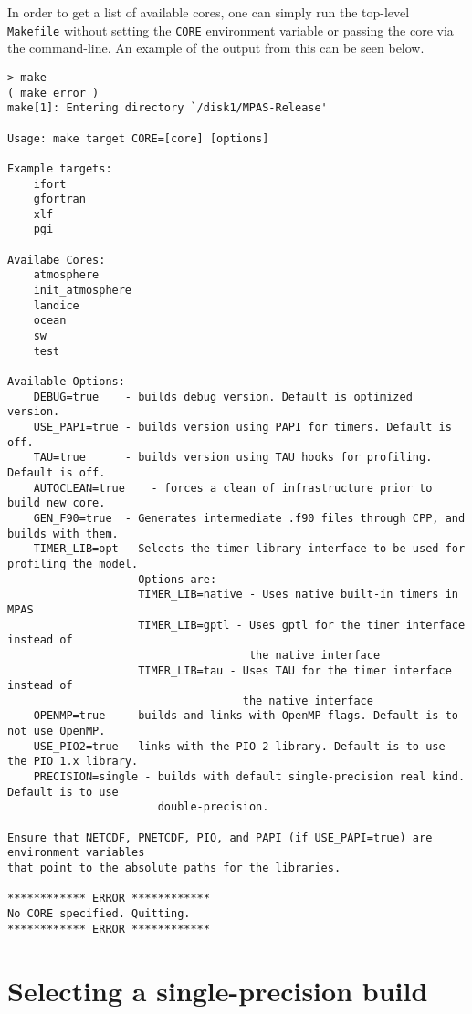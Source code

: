 In order to get a list of available cores, one can simply run the top-level {\tt
Makefile} without setting the {\tt CORE} environment variable or passing the
core via the command-line. An example of the output from this can be seen
below.

{\small
\begin{verbatim}
> make
( make error )
make[1]: Entering directory `/disk1/MPAS-Release'

Usage: make target CORE=[core] [options]

Example targets:
    ifort
    gfortran
    xlf
    pgi

Availabe Cores:
    atmosphere
    init_atmosphere
    landice
    ocean
    sw
    test

Available Options:
    DEBUG=true    - builds debug version. Default is optimized version.
    USE_PAPI=true - builds version using PAPI for timers. Default is off.
    TAU=true      - builds version using TAU hooks for profiling. Default is off.
    AUTOCLEAN=true    - forces a clean of infrastructure prior to build new core.
    GEN_F90=true  - Generates intermediate .f90 files through CPP, and builds with them.
    TIMER_LIB=opt - Selects the timer library interface to be used for profiling the model.
                    Options are:
                    TIMER_LIB=native - Uses native built-in timers in MPAS
                    TIMER_LIB=gptl - Uses gptl for the timer interface instead of
                                     the native interface
                    TIMER_LIB=tau - Uses TAU for the timer interface instead of
                                    the native interface
    OPENMP=true   - builds and links with OpenMP flags. Default is to not use OpenMP.
    USE_PIO2=true - links with the PIO 2 library. Default is to use the PIO 1.x library.
    PRECISION=single - builds with default single-precision real kind. Default is to use
                       double-precision.

Ensure that NETCDF, PNETCDF, PIO, and PAPI (if USE_PAPI=true) are environment variables
that point to the absolute paths for the libraries.

************ ERROR ************
No CORE specified. Quitting.
************ ERROR ************
\end{verbatim}
}

\section{Selecting a single-precision build}

